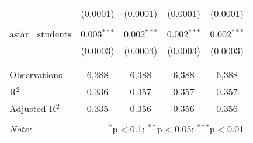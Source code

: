 \begin{table}[!htbp]
\begin{tabular}{@{\extracolsep{-2pt}}lcccc}
  & (0.0001) & (0.0001) & (0.0001) & (0.0001) \\ 
  & & & & \\ 
 asian\_students & 0.003$^{***}$ & 0.002$^{***}$ & 0.002$^{***}$ & 0.002$^{***}$ \\ 
  & (0.0003) & (0.0003) & (0.0003) & (0.0003) \\ 
  & & & & \\ 
\hline \\[-1.8ex] 
Observations & 6,388 & 6,388 & 6,388 & 6,388 \\ 
R$^{2}$ & 0.336 & 0.357 & 0.357 & 0.357 \\ 
Adjusted R$^{2}$ & 0.335 & 0.356 & 0.356 & 0.356 \\ 
\hline 
\hline \\[-1.8ex] 
\textit{Note:}  & \multicolumn{4}{r}{$^{*}$p$<$0.1; $^{**}$p$<$0.05; $^{***}$p$<$0.01} \\ 
\end{tabular} 
\end{table} 
